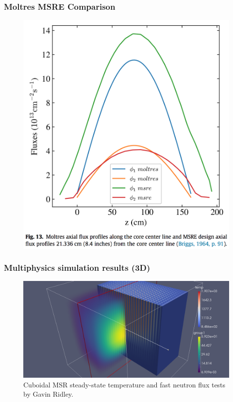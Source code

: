 \begin{frame}
        \frametitle{Moltres MSRE Comparison}
  \begin{figure}
   \vspace{-0.05in}
   \includegraphics[height=0.85\textheight]{./images/moltres-axial-flux.png}
    \end{figure}
\end{frame}


\begin{frame}
  \frametitle{Multiphysics simulation results (3D)}
  \begin{figure}[t]
   \vspace{-0.1in}
   \hspace*{-0.45in}
   \includegraphics[height=0.75\textheight]{./images/moltres_3D.png}
   \caption{Cuboidal \gls{MSR} steady-state temperature and fast neutron flux 
          tests by Gavin Ridley.} 
    \end{figure}

\end{frame}
